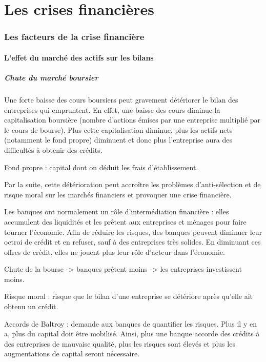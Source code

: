 \part{Les crises financières}

\section{Les facteurs de la crise financière}	
	
	\subsection{L'effet du marché des actifs sur les bilans}
	
		\subsubsection{Chute du marché boursier}
	
		Une forte baisse des cours boursiers peut gravement détériorer le bilan des entreprises qui empruntent. En effet, une baisse des cours diminue la capitalisation boursière (nombre d'actions émises par une entreprise multiplié par le cours de bourse). Plus cette capitalisation diminue, plus les actifs nets (notamment le fond propre) diminuent et donc plus l'entreprise aura des difficultés à obtenir des crédits.
	
		Fond propre : capital dont on déduit les frais d'établissement.
	
		Par la suite, cette détérioration peut accroître les problèmes d'anti-sélection et de risque moral sur les marchés financiers et provoquer une crise financière. 
	
		Les banques ont normalement un rôle d'intermédiation financière : elles accumulent des liquidités et les prêtent aux entreprises et ménages pour faire tourner l'économie. Afin de réduire les risques, des banques peuvent diminuer leur octroi de crédit et en refuser, sauf à des entreprises très solides. En diminuant ces offres de crédit, elles ne jouent plus leur rôle d'acteur dans l'économie.
	
		Chute de la bourse -> banques prêtent moins -> les entreprises investissent moins.

		Risque moral : risque que le bilan d'une entreprise se détériore après qu'elle ait obtenu un crédit.
	
		Accords de Baltroy : demande aux banques de quantifier les risques. Plus il y en a, plus du capital doit être mobilisé. Ainsi, plus une banque accorde des crédits à des entreprises de mauvaise qualité, plus les risques sont élevés et plus les augmentations de capital seront nécessaire.
		
